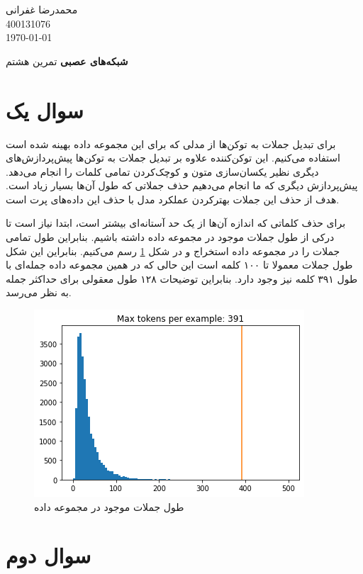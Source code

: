 \documentclass[12pt, a4paper]{book}
\newcommand{\coursetitle}{شبکه‌های عصبی}
\newcommand{\doctitle}{تمرین هشتم}
\newcommand{\name}{محمدرضا غفرانی}
\newcommand{\studentno}{400131076}
\newcommand{\todaydate}{\today}
\begin{document}
\begin{flushleft}
    \name \\
    \studentno \\
    \todaydate
\end{flushleft}

\begin{center}
    \huge
    \textbf{\coursetitle}
    \break
    \large
    \doctitle
\end{center}

\thispagestyle{plain}

\section*{سوال یک}

برای تبدیل جملات به توکن‌ها از مدلی که برای این مجموعه داده
بهینه شده است
استفاده می‌کنیم. این توکن‌کننده علاوه بر تبدیل جملات به توکن‌ها پیش‌پردازش‌های دیگری نظیر
یکسان‌سازی متون و کوچک‌کردن تمامی کلمات
را انجام می‌دهد. پیش‌پردازش دیگری که ما انجام می‌دهیم حذف جملاتی که طول آن‌ها بسیار زیاد است.
هدف از حذف این جملات بهتر‌کردن عملکرد مدل با حذف این داده‌های پرت است.

برای حذف کلماتی که اندازه آن‌ها از یک حد آستانه‌ای بیشتر است، ابتدا نیاز است تا درکی از طول جملات
موجود در مجموعه داده داشته باشیم. بنابراین طول تمامی جملات را در مجموعه داده استخراج و در شکل
\ref{sentence_lengths} رسم می‌کنیم. بنابراین این شکل طول جملات معمولا تا ۱۰۰ کلمه است این حالی که
در همین مجموعه داده جمله‌ای با طول ۳۹۱ کلمه نیز وجود دارد.
بنابراین توضیحات ۱۲۸ طول معقولی برای حداکثر جمله به نظر می‌رسد.

\begin{figure}[h]
    \centering
    \includegraphics[width=0.4\linewidth]{images/lengths.png}
    \caption{طول جملات موجود در مجموعه داده}
    \label{sentence_lengths}
\end{figure}

\section*{سوال دوم}
\end{document}
